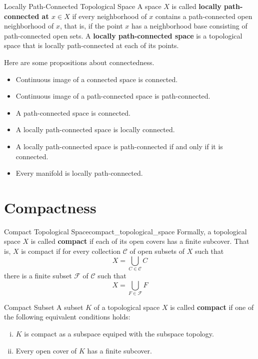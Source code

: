 \documentclass{report}
\begin{document}
\begin{definition}{Locally Path-Connected Topological Space}{}
	A space $X$ is called \textbf{locally path-connected at $x\in X$} if every neighborhood of $x$ contains a path-connected open neighborhood of $x$, that is, if the point $x$ has a neighborhood base consisting of path-connected open sets. A \textbf{locally path-connected space} is a topological space that is locally path-connected at each of its points.
\end{definition}


\begin{proposition}{}{}
	Here are some propositions about connectedness.
	\begin{itemize}
		\item Continuous image of a connected space is connected.
		\item Continuous image of a path-connected space is path-connected.
		\item A path-connected space is connected.
		\item A locally path-connected space is locally connected.
		\item A locally path-connected space is path-connected if and only if it is connected.
		\item Every manifold is locally path-connected.
	\end{itemize}

\end{proposition}


\section{Compactness}
\begin{definition}{Compact Topological Space}{compact_topological_space}
	Formally, a topological space $X$ is called \textbf{compact} if each of its open covers has a finite subcover. That is, $X$ is compact if for every collection $\mathcal{C}$ of open subsets of $X$ such that
	\[
		X=\bigcup_{C \in \mathcal{C}} C
	\]
	there is a finite subset $\mathcal{F}$ of $\mathcal{C}$ such that
	\[
		X=\bigcup_{F \in \mathcal{F}} F
	\]
\end{definition}

\begin{definition}{Compact Subset}{}
	A subset $K$ of a topological space $X$ is called \textbf{compact} if one of the following equivalent conditions holds:

	\begin{enumerate}[(i)]
		\item $K$ is compact as a subspace equiped with the subspace topology.
		\item Every open cover of $K$ has a finite subcover.
	\end{enumerate}
\end{definition}
\end{document}
